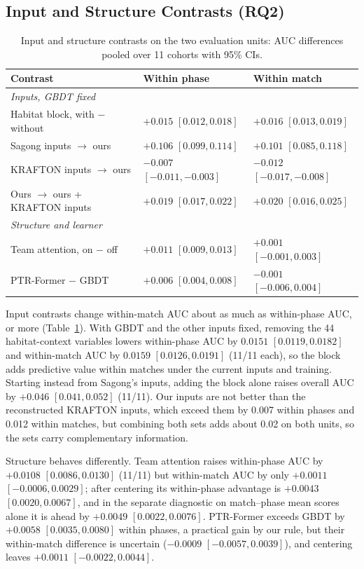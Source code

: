 \documentclass[sigconf,anonymous,nonacm]{acmart}
\begin{document}
\subsection{Input and Structure Contrasts (RQ2)}
\label{sec:results:inputs}
\begin{table}[t]
\centering\scriptsize
\caption{Input and structure contrasts on the two evaluation units: AUC differences pooled over 11 cohorts with 95\% CIs.}
\label{tab:contrasts}
\setlength{\tabcolsep}{2.5pt}
\begin{tabular}{lll}
\toprule
Contrast & Within phase & Within match \\
\midrule
\multicolumn{3}{l}{\emph{Inputs, GBDT fixed}} \\
Habitat block, with $-$ without & $+0.015$ $[0.012, 0.018]$ & $+0.016$ $[0.013, 0.019]$ \\
Sagong inputs $\to$ ours & $+0.106$ $[0.099, 0.114]$ & $+0.101$ $[0.085, 0.118]$ \\
KRAFTON inputs $\to$ ours & $-0.007$ $[-0.011, -0.003]$ & $-0.012$ $[-0.017, -0.008]$ \\
Ours $\to$ ours + KRAFTON inputs & $+0.019$ $[0.017, 0.022]$ & $+0.020$ $[0.016, 0.025]$ \\
\midrule
\multicolumn{3}{l}{\emph{Structure and learner}} \\
Team attention, on $-$ off & $+0.011$ $[0.009, 0.013]$ & $+0.001$ $[-0.001, 0.003]$ \\
PTR-Former $-$ GBDT & $+0.006$ $[0.004, 0.008]$ & $-0.001$ $[-0.006, 0.004]$ \\
\bottomrule
\end{tabular}
\end{table}
Input contrasts change within-match AUC about as much as within-phase AUC, or more (Table~\ref{tab:contrasts}). With GBDT and the other inputs fixed, removing the 44 habitat-context variables lowers within-phase AUC by $0.0151$ $[0.0119,\allowbreak 0.0182]$ and within-match AUC by $0.0159$ $[0.0126,\allowbreak 0.0191]$ (11/11 each), so the block adds predictive value within matches under the current inputs and training. Starting instead from Sagong's inputs, adding the block alone raises overall AUC by $+0.046$ $[0.041,\allowbreak 0.052]$ (11/11). Our inputs are not better than the reconstructed KRAFTON inputs, which exceed them by 0.007 within phases and 0.012 within matches, but combining both sets adds about 0.02 on both units, so the sets carry complementary information.

Structure behaves differently. Team attention raises within-phase AUC by $+0.0108$ $[0.0086,\allowbreak 0.0130]$ (11/11) but within-match AUC by only $+0.0011$ $[-0.0006,\allowbreak 0.0029]$; after centering its within-phase advantage is $+0.0043$ $[0.0020,\allowbreak 0.0067]$, and in the separate diagnostic on match--phase mean scores alone it is ahead by $+0.0049$ $[0.0022,\allowbreak 0.0076]$. PTR-Former exceeds GBDT by $+0.0058$ $[0.0035,\allowbreak 0.0080]$ within phases, a practical gain by our rule, but their within-match difference is uncertain ($-0.0009$ $[-0.0057,\allowbreak 0.0039]$), and centering leaves $+0.0011$ $[-0.0022,\allowbreak 0.0044]$.
\end{document}
